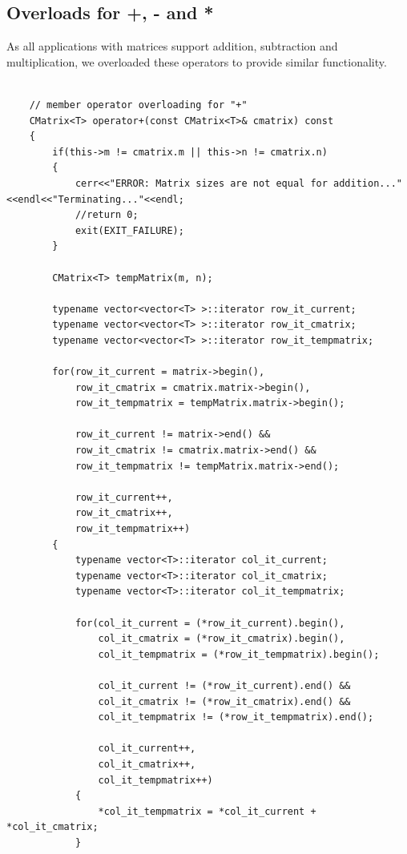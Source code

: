 \documentclass{article}
\begin{document}
	\subsection{Overloads for +, - and *}
	As all applications with matrices support addition, subtraction and multiplication, we overloaded these operators to provide similar functionality.
		\begin{lstlisting}[label=CMatrixOperations, caption=CMatrix Basic Operations]
	
    // member operator overloading for "+"
    CMatrix<T> operator+(const CMatrix<T>& cmatrix) const
    {
        if(this->m != cmatrix.m || this->n != cmatrix.n)
        {
            cerr<<"ERROR: Matrix sizes are not equal for addition..."<<endl<<"Terminating..."<<endl;
            //return 0;
            exit(EXIT_FAILURE);
        }

        CMatrix<T> tempMatrix(m, n);

        typename vector<vector<T> >::iterator row_it_current;
        typename vector<vector<T> >::iterator row_it_cmatrix;
        typename vector<vector<T> >::iterator row_it_tempmatrix;

        for(row_it_current = matrix->begin(),
            row_it_cmatrix = cmatrix.matrix->begin(),
            row_it_tempmatrix = tempMatrix.matrix->begin();

            row_it_current != matrix->end() &&
            row_it_cmatrix != cmatrix.matrix->end() &&
            row_it_tempmatrix != tempMatrix.matrix->end();

            row_it_current++,
            row_it_cmatrix++,
            row_it_tempmatrix++)
        {
            typename vector<T>::iterator col_it_current;
            typename vector<T>::iterator col_it_cmatrix;
            typename vector<T>::iterator col_it_tempmatrix;

            for(col_it_current = (*row_it_current).begin(),
                col_it_cmatrix = (*row_it_cmatrix).begin(),
                col_it_tempmatrix = (*row_it_tempmatrix).begin();

                col_it_current != (*row_it_current).end() &&
                col_it_cmatrix != (*row_it_cmatrix).end() &&
                col_it_tempmatrix != (*row_it_tempmatrix).end();

                col_it_current++,
                col_it_cmatrix++,
                col_it_tempmatrix++)
            {
                *col_it_tempmatrix = *col_it_current + *col_it_cmatrix;
            }


\end{lstlisting}
\end{document}
